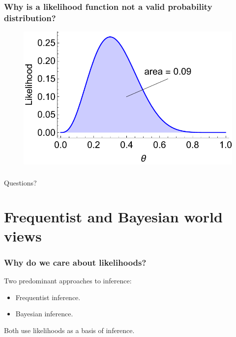 \documentclass[handout]{beamer}
\begin{document}
\begin{frame}
	\frametitle{Why is a likelihood function not a valid probability distribution?}
	
	\begin{figure}[h]
		\centerline{\includegraphics[width=1\textwidth]{figures/binomial_likelihood_area.pdf}}
	\end{figure}
	
\end{frame}

\begin{frame}
	\frametitle{}
	{\Huge Questions?}
\end{frame}

\section{Frequentist and Bayesian world views}
\frame{\tableofcontents[currentsection]}

\begin{frame}
	\frametitle{Why do we care about likelihoods?}
	Two predominant approaches to inference:
	
	\begin{itemize}
		\item Frequentist inference.
		\item Bayesian inference.
	\end{itemize}
	
	Both use likelihoods as a basis of inference.
	
\end{frame}
\end{document}
